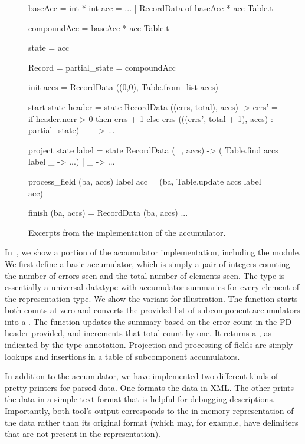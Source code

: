 \begin{figure}
\begin{code}\scriptsize
{} baseAcc = int * int
 acc = ...
| RecordData of baseAcc * acc Table.t

 compoundAcc = baseAcc * acc Table.t

 state = acc

 Record = 
   partial_state = compoundAcc

   init accs = RecordData ((0,0), Table.from_list accs)

   start state header =
     state 
      RecordData ((errs, total), accs) ->
	 errs' = if header.nerr > 0
                    then errs + 1 else errs
	 (((errs', total + 1), accs) : partial_state)
    | _ ->  ...
	  
   project state label = 
      state 
      RecordData (_, accs) -> ( Table.find accs label
                                  _ ->  ...)
    | _ ->  ...

   process_field (ba, accs) label acc =
    (ba, Table.update accs label acc)
      
   finish (ba, accs) = RecordData (ba, accs)
...
\end{code}
\caption{Excerpts from the implementation of the accumulator.}
\label{fig:gentool-accum-code}
\end{figure}

In~, we show a portion of the
accumulator implementation, including the  module. We first
define a basic accumulator, which is simply a pair of integers
counting the number of errors seen and the total number of elements
seen. The type  is essentially a universal datatype with
accumulator summaries for every element of the representation type. We
show the  variant for illustration.  The 
function starts both counts at zero and converts the provided list of
subcomponent accumulators into a .  The 
function updates the summary based on the error count  in the
PD header provided, and increments that total count by one. It returns
a , as indicated by the type annotation. Projection
and processing of fields are simply lookups and insertions in a table
of subcomponent accumulators.

In addition to the accumulator, we have implemented two different
kinds of pretty printers for parsed data.  One formats the data in
XML. The other prints the data in a simple text format that is helpful
for debugging descriptions. Importantly, both tool's output corresponds to the in-memory
representation of the data rather than its original format (which may,
for example, have delimiters that are not present in the
representation).

